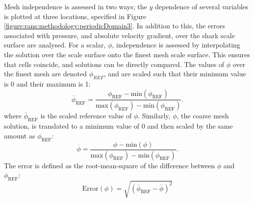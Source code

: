 \documentclass[12pt,oneside,a4paper]{article}
\begin{document}
Mesh independence is assessed in two ways; the $y$ dependence of several variables is plotted at three locations, specified in Figure \ref{figure:rans:methodology:periodicDomain3}. In addition to this, the errors associated with pressure, and absolute velocity gradient, over the shark scale surface are analysed. For a scalar, $\phi$, independence is assessed by interpolating the solution over the scale surface onto the finest mesh scale surface. This ensures that cells coincide, and solutions can be directly compared. The values of $\phi$ over the finest mesh are denoted $\phi_{REF}$, and are scaled such that their minimum value is 0 and their maximum is 1:
\begin{equation}
\overline{\phi}_{\text{REF}} = \frac{\phi_{\text{REF}}-\text{min}(\phi_{\text{REF}})}{\text{max}(\phi_{\text{REF}})-\text{min}(\phi_{\text{REF}})}.
\end{equation}
where $\overline{\phi}_{\text{REF}}$ is the scaled reference value of $\phi$. Similarly, $\phi$, the coarse mesh solution, is translated to a minimum value of 0 and then scaled by the same amount as $\phi_{\text{REF}}$:
\begin{equation}
\overline{\phi} = \frac{\phi-\text{min}(\phi)}{\text{max}(\phi_{\text{REF}})-\text{min}(\phi_{\text{REF}})}.
\end{equation}
The error is defined as the root-mean-square of the difference between $\phi$ and $\phi_{\text{REF}}$:
\begin{equation}
\text{Error}(\phi) = \sqrt{(\overline{\phi}_{\text{REF}} - \overline{\phi})^2}
\end{equation}
\end{document}
